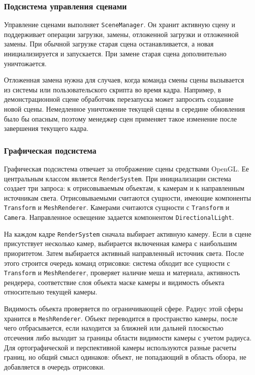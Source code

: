 \subsubsection{Подсистема управления сценами}

Управление сценами выполняет \texttt{SceneManager}. Он хранит активную сцену и
поддерживает операции загрузки, замены, отложенной загрузки и отложенной замены.
При обычной загрузке старая сцена останавливается, а новая инициализируется и
запускается. При замене старая сцена дополнительно уничтожается.

Отложенная замена нужна для случаев, когда команда смены сцены вызывается из
системы или пользовательского скрипта во время кадра. Например, в демонстрационной
сцене обработчик перезапуска может запросить создание новой сцены. Немедленное
уничтожение текущей сцены в середине обновления было бы опасным, поэтому
менеджер сцен применяет такое изменение после завершения текущего кадра.

\subsubsection{Графическая подсистема}

Графическая подсистема отвечает за отображение сцены средствами OpenGL. Ее
центральным классом является \texttt{RenderSystem}. При инициализации система
создает три запроса: к отрисовываемым объектам, к камерам и к направленным
источникам света. Отрисовываемыми считаются сущности, имеющие компоненты
\texttt{Transform} и \texttt{MeshRenderer}. Камерами считаются сущности с
\texttt{Transform} и \texttt{Camera}. Направленное освещение задается компонентом
\texttt{DirectionalLight}.

На каждом кадре \texttt{RenderSystem} сначала выбирает активную камеру. Если
в сцене присутствует несколько камер, выбирается включенная камера с наибольшим
приоритетом. Затем выбирается активный направленный источник света. После
этого строится очередь команд отрисовки: система обходит все сущности с
\texttt{Transform} и \texttt{MeshRenderer}, проверяет наличие меша и материала,
активность рендерера, соответствие слоя объекта маске камеры и видимость
объекта относительно текущей камеры.

Видимость объекта проверяется по ограничивающей сфере. Радиус этой сферы
хранится в \texttt{MeshRenderer}. Объект переводится в пространство камеры,
после чего отбрасывается, если находится за ближней или дальней плоскостью
отсечения либо выходит за границы области видимости камеры с учетом радиуса.
Для ортографической и перспективной камеры используются разные расчеты границ,
но общий смысл одинаков: объект, не попадающий в область обзора, не добавляется
в очередь отрисовки.

